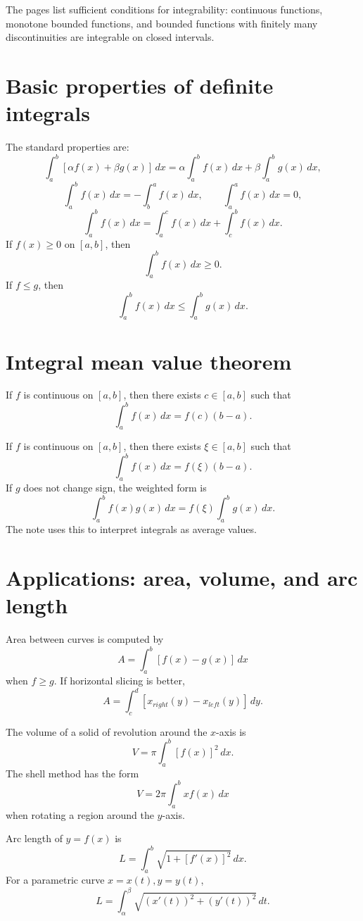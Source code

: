 The pages list sufficient conditions for integrability: continuous functions, monotone bounded functions, and bounded functions with finitely many discontinuities are integrable on closed intervals.

\section{Basic properties of definite integrals}

The standard properties are:
\[
  \int_a^b [\alpha f(x)+\beta g(x)]\,dx
  =
  \alpha\int_a^b f(x)\,dx+\beta\int_a^b g(x)\,dx,
\]
\[
  \int_a^b f(x)\,dx=-\int_b^a f(x)\,dx,\qquad
  \int_a^a f(x)\,dx=0,
\]
\[
  \int_a^b f(x)\,dx=\int_a^c f(x)\,dx+\int_c^b f(x)\,dx.
\]
If $f(x)\ge0$ on $[a,b]$, then
\[
  \int_a^b f(x)\,dx\ge0.
\]
If $f\le g$, then
\[
  \int_a^b f(x)\,dx\le\int_a^b g(x)\,dx.
\]

\section{Integral mean value theorem}

\begin{theorem}
If \(f\) is continuous on \([a,b]\), then there exists \(c\in[a,b]\) such that
\[
  \int_a^b f(x)\,dx=f(c)(b-a).
\]
\end{theorem}


If $f$ is continuous on $[a,b]$, then there exists $\xi\in[a,b]$ such that
\[
  \int_a^b f(x)\,dx=f(\xi)(b-a).
\]
If $g$ does not change sign, the weighted form is
\[
  \int_a^b f(x)g(x)\,dx
  =
  f(\xi)\int_a^b g(x)\,dx.
\]
The note uses this to interpret integrals as average values.

\section{Applications: area, volume, and arc length}

Area between curves is computed by
\[
  A=\int_a^b [f(x)-g(x)]\,dx
\]
when $f\ge g$.  If horizontal slicing is better,
\[
  A=\int_c^d [x_{right}(y)-x_{left}(y)]\,dy.
\]

The volume of a solid of revolution around the $x$-axis is
\[
  V=\pi\int_a^b [f(x)]^2\,dx.
\]
The shell method has the form
\[
  V=2\pi\int_a^b x f(x)\,dx
\]
when rotating a region around the $y$-axis.

Arc length of $y=f(x)$ is
\[
  L=\int_a^b \sqrt{1+[f'(x)]^2}\,dx.
\]
For a parametric curve $x=x(t),y=y(t)$,
\[
  L=\int_\alpha^\beta
  \sqrt{(x'(t))^2+(y'(t))^2}\,dt.
\]

